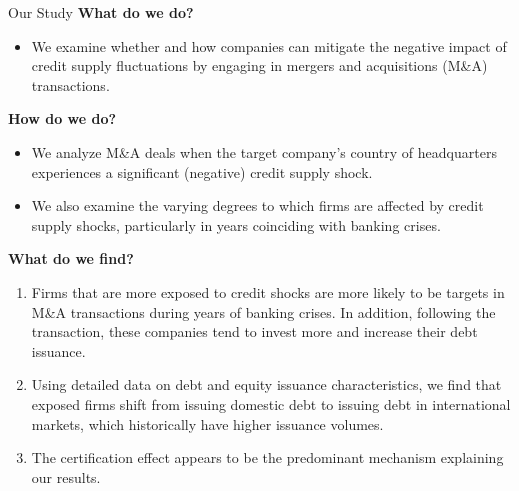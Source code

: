 \documentclass[10pt]{beamer}
\begin{document}
\begin{frame}{Our Study}
\textbf{What do we do?}
\begin{itemize}
    \item We examine whether and how companies can mitigate the negative impact of credit supply fluctuations by engaging in mergers and acquisitions (M\&A) transactions. \pause
\end{itemize}
    
\textbf{How do we do?}
\begin{itemize}
    \item We analyze M\&A deals when the target company's country of headquarters experiences a significant (negative) credit supply shock. 
    \item We also examine the varying degrees to which firms are affected by credit supply shocks, particularly in years coinciding with banking crises. \pause
\end{itemize}

\textbf{What do we find?}
\begin{enumerate}
    \item Firms that are more exposed to credit shocks are more likely to be targets in M\&A transactions during years of banking crises. In addition, following the transaction, these companies tend to invest more and increase their debt issuance. \pause
    \item Using detailed data on debt and equity issuance characteristics, we find that exposed firms shift from issuing domestic debt to issuing debt in international markets, which historically have higher issuance volumes. 
    \item The certification effect appears to be the predominant mechanism explaining our results.
\end{enumerate}
\end{frame}
\end{document}
